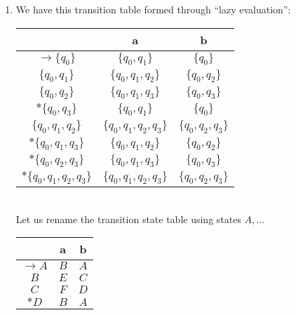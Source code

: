 \documentclass[]{article}
\begin{document}
\begin{enumerate}
\begin{enumerate}
\begin{displaymath}
{                                             & q_1 \ar[dr]^b &                        & q_1 \ar[dr]^a           & q_1 \ar[dr]^b &     \\
                                             &               & q_2 \ar[dr]^a          &                         & q_2 \ar[dr]^b & q_2 \\ 
                                             &               &                        & q_3                     &               & q_3 }
          \end{displaymath} 
          where the initial $q_3$ becomes stuck, due to its inability to 
          process the rest of the string.
        \item We have this transition table formed through ``lazy evaluation'': 
        \\
          \begin{tabular}{c|c|c}
                                  & a                  & b             \\ \hline
            $\rightarrow \{q_0\}$ & $\{q_0, q_1\}$     & $\{q_0\}$     \\
            $\{q_0, q_1\}$        & $\{q_0,q_1,q_2\}$  & $\{q_0,q_2\}$ \\
            $\{q_0, q_2\}$        & $\{q_0,q_1,q_3\}$  & $\{q_0,q_3\}$ \\
            $*\{q_0, q_3\}$       & $\{q_0,q_1\}$      & $\{q_0\}$     \\
            $\{q_0,q_1,q_2\}$     & $\{q_0,q_1,q_2,q_3\}$ & $\{q_0,q_2,q_3\}$ \\
            $*\{q_0,q_1,q_3\}$    & $\{q_0,q_1,q_2\}$ & $\{q_0,q_2\}$ \\
            $*\{q_0,q_2,q_3\}$    & $\{q_0,q_1,q_3\}$ & $\{q_0,q_3\}$ \\
            $*\{q_0,q_1,q_2,q_3\}$& $\{q_0,q_1,q_2,q_3\}$ & $\{q_0,q_2,q_3\}$
          \end{tabular} \\ 
        Let us rename the transition state table using states $A, \ldots$ \\
          \begin{tabular}{c|c|c}
                            & a   & b   \\ \hline
            $\rightarrow A$ & $B$ & $A$ \\
            $B$             & $E$ & $C$ \\
            $C$             & $F$ & $D$ \\
            $*D$            & $B$ & $A$ \\

\end{tabular}
\end{enumerate}
\end{enumerate}
\end{document}
